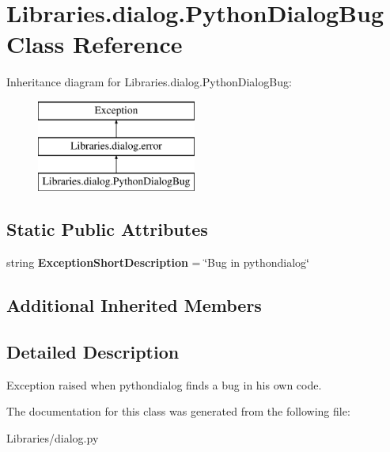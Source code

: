 \hypertarget{class_libraries_1_1dialog_1_1_python_dialog_bug}{}\section{Libraries.\+dialog.\+Python\+Dialog\+Bug Class Reference}
\label{class_libraries_1_1dialog_1_1_python_dialog_bug}
Inheritance diagram for Libraries.\+dialog.\+Python\+Dialog\+Bug\+:\begin{figure}[H]
\begin{center}
\leavevmode
\includegraphics[height=3.000000cm]{class_libraries_1_1dialog_1_1_python_dialog_bug}
\end{center}
\end{figure}
\subsection*{Static Public Attributes}
\begin{DoxyCompactItemize}
\item 
string {\bfseries Exception\+Short\+Description} = \char`\"{}Bug in pythondialog\char`\"{}\hypertarget{class_libraries_1_1dialog_1_1_python_dialog_bug_adfbcf2058fa7679f93c05c15d8ef4c39}{}\label{class_libraries_1_1dialog_1_1_python_dialog_bug_adfbcf2058fa7679f93c05c15d8ef4c39}

\end{DoxyCompactItemize}
\subsection*{Additional Inherited Members}


\subsection{Detailed Description}
\begin{DoxyVerb}Exception raised when pythondialog finds a bug in his own code.\end{DoxyVerb}
 

The documentation for this class was generated from the following file\+:\begin{DoxyCompactItemize}
\item 
Libraries/dialog.\+py\end{DoxyCompactItemize}
